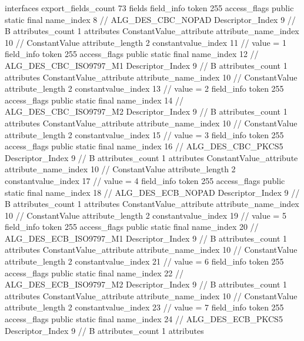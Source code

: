 {{{			interfaces {
			}
			export_fields_count	73
			fields {
			field_info {
				token	255
				access_flags	public static final
				name_index	8		// ALG_DES_CBC_NOPAD
				Descriptor_Index	9		// B
				attributes_count	1
				attributes {
				ConstantValue_attribute {
					attribute_name_index	10		// ConstantValue
					attribute_length	2
					constantvalue_index	11		// value = 1
				}
				}
			}
			field_info {
				token	255
				access_flags	public static final
				name_index	12		// ALG_DES_CBC_ISO9797_M1
				Descriptor_Index	9		// B
				attributes_count	1
				attributes {
				ConstantValue_attribute {
					attribute_name_index	10		// ConstantValue
					attribute_length	2
					constantvalue_index	13		// value = 2
				}
				}
			}
			field_info {
				token	255
				access_flags	public static final
				name_index	14		// ALG_DES_CBC_ISO9797_M2
				Descriptor_Index	9		// B
				attributes_count	1
				attributes {
				ConstantValue_attribute {
					attribute_name_index	10		// ConstantValue
					attribute_length	2
					constantvalue_index	15		// value = 3
				}
				}
			}
			field_info {
				token	255
				access_flags	public static final
				name_index	16		// ALG_DES_CBC_PKCS5
				Descriptor_Index	9		// B
				attributes_count	1
				attributes {
				ConstantValue_attribute {
					attribute_name_index	10		// ConstantValue
					attribute_length	2
					constantvalue_index	17		// value = 4
				}
				}
			}
			field_info {
				token	255
				access_flags	public static final
				name_index	18		// ALG_DES_ECB_NOPAD
				Descriptor_Index	9		// B
				attributes_count	1
				attributes {
				ConstantValue_attribute {
					attribute_name_index	10		// ConstantValue
					attribute_length	2
					constantvalue_index	19		// value = 5
				}
				}
			}
			field_info {
				token	255
				access_flags	public static final
				name_index	20		// ALG_DES_ECB_ISO9797_M1
				Descriptor_Index	9		// B
				attributes_count	1
				attributes {
				ConstantValue_attribute {
					attribute_name_index	10		// ConstantValue
					attribute_length	2
					constantvalue_index	21		// value = 6
				}
				}
			}
			field_info {
				token	255
				access_flags	public static final
				name_index	22		// ALG_DES_ECB_ISO9797_M2
				Descriptor_Index	9		// B
				attributes_count	1
				attributes {
				ConstantValue_attribute {
					attribute_name_index	10		// ConstantValue
					attribute_length	2
					constantvalue_index	23		// value = 7
				}
				}
			}
			field_info {
				token	255
				access_flags	public static final
				name_index	24		// ALG_DES_ECB_PKCS5
				Descriptor_Index	9		// B
				attributes_count	1
				attributes {
}}}}}}
